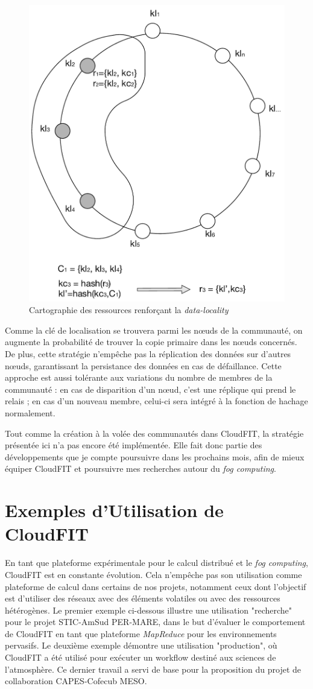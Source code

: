 \begin{figure}[!ht]
	\centering
	\includegraphics[width=0.5\linewidth]{img/hashing.pdf}
	\caption{Cartographie des ressources renforçant la \textit{data-locality}}
	\label{fig:hash}
\end{figure}

Comme la clé de localisation se trouvera parmi les n{\oe}uds de la communauté, on augmente la probabilité de trouver la copie primaire dans les n{\oe}uds concernés. De plus, cette stratégie n'empêche pas la réplication des données sur d'autres n{\oe}uds, garantissant la persistance des données en cas de défaillance. Cette approche est aussi tolérante aux variations du nombre de membres de la communauté : en cas de disparition d'un n{\oe}ud, c'est une réplique qui prend le relais ; en cas d'un nouveau membre, celui-ci sera intégré à la fonction de hachage normalement.   

Tout comme la création à la volée des communautés dans CloudFIT, la stratégie présentée ici n'a pas encore été implémentée. Elle fait donc partie des développements que je compte poursuivre dans les prochains mois, afin de mieux équiper CloudFIT et poursuivre mes recherches autour du \textit{fog computing}.

\section{Exemples d'Utilisation de CloudFIT}

En tant que plateforme expérimentale pour le calcul distribué et le \textit{fog computing}, CloudFIT est en constante évolution. Cela n'empêche pas son utilisation comme plateforme de calcul dans certains de nos projets, notamment ceux dont l'objectif est d'utiliser des réseaux avec des éléments volatiles ou avec des ressources hétérogènes. Le premier exemple ci-dessous illustre une utilisation "recherche" pour le projet STIC-AmSud PER-MARE, dans le but d'évaluer le comportement de CloudFIT en tant que plateforme \textit{MapReduce} pour les environnements pervasifs. Le deuxième exemple démontre une utilisation "production", où CloudFIT a été utilisé pour exécuter un workflow destiné aux sciences de l'atmosphère. Ce dernier travail a servi de base  pour la proposition du projet de collaboration CAPES-Cofecub MESO. 


